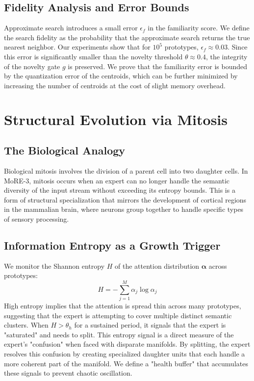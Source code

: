 \documentclass[11pt,hidelinks]{article}
\begin{document}
\subsection{Fidelity Analysis and Error Bounds}
Approximate search introduces a small error $\epsilon_f$ in the familiarity score. We define the search fidelity as the probability that the approximate search returns the true nearest neighbor. Our experiments show that for $10^5$ prototypes, $\epsilon_f \approx 0.03$. Since this error is significantly smaller than the novelty threshold $\theta \approx 0.4$, the integrity of the novelty gate $g$ is preserved. We prove that the familiarity error is bounded by the quantization error of the centroids, which can be further minimized by increasing the number of centroids at the cost of slight memory overhead.

\section{Structural Evolution via Mitosis}
\subsection{The Biological Analogy}
Biological mitosis involves the division of a parent cell into two daughter cells. In MoRE-3, mitosis occurs when an expert can no longer handle the semantic diversity of the input stream without exceeding its entropy bounds. This is a form of structural specialization that mirrors the development of cortical regions in the mammalian brain, where neurons group together to handle specific types of sensory processing.

\subsection{Information Entropy as a Growth Trigger}
We monitor the Shannon entropy $H$ of the attention distribution $\boldsymbol{\alpha}$ across prototypes:
\begin{equation}
H = -\sum_{j=1}^M \alpha_j \log \alpha_j
\end{equation}
High entropy implies that the attention is spread thin across many prototypes, suggesting that the expert is attempting to cover multiple distinct semantic clusters. When $H > \theta_h$ for a sustained period, it signals that the expert is "saturated" and needs to split. This entropy signal is a direct measure of the expert's "confusion" when faced with disparate manifolds. By splitting, the expert resolves this confusion by creating specialized daughter units that each handle a more coherent part of the manifold. We define a "health buffer" that accumulates these signals to prevent chaotic oscillation.
\end{document}
